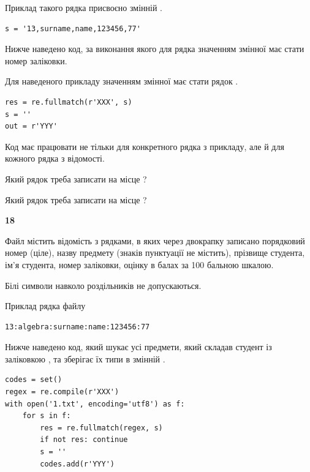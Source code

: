 Приклад такого рядка присвоєно змінній .



\begin{verbatim}
s = '13,surname,name,123456,77'
\end{verbatim}


Нижче наведено код, за виконання якого для рядка  значенням змінної  має стати номер заліковки.

Для наведеного прикладу значенням змінної  має стати рядок  .



\begin{verbatim}
res = re.fullmatch(r'XXX', s)
s = ''
out = r'YYY'
\end{verbatim}


Код має працювати не тільки для конкретного рядка з прикладу, але й для кожного рядка з відомості.




Який рядок треба записати на місце  ?\par
\vspace{5mm}


Який рядок треба записати на місце  ?\par


\newpage

{\begin {center}\textbf{ 18}\end {center}}\par
Файл  містить відомість з рядками, в яких через двокрапку записано поряд\-ковий номер (ціле), назву предмету (знаків пунктуації не містить), прізвище студента, ім'я студента, номер заліковки, оцінку в балах за 100 бальною шкалою.

Білі символи навколо роздільників не допускаються.

Приклад рядка файлу



\begin{verbatim}
13:algebra:surname:name:123456:77
\end{verbatim}


Нижче наведено код, який шукає усі предмети, який складав студент із заліковкою , та зберігає їх типи в змінній .



\begin{verbatim}
codes = set()
regex = re.compile(r'XXX')
with open('1.txt', encoding='utf8') as f:
    for s in f:
        res = re.fullmatch(regex, s)
        if not res: continue
        s = ''
        codes.add(r'YYY')
\end{verbatim}





